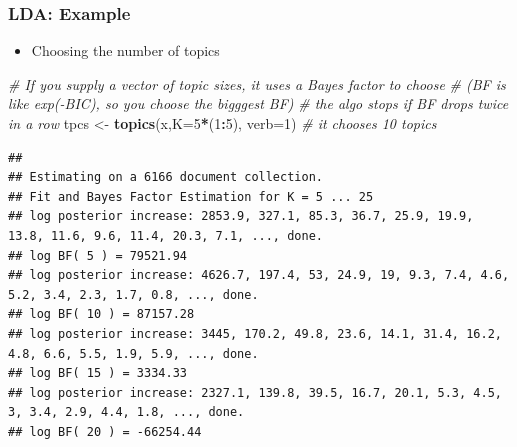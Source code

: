 \documentclass[
  shownotes,
  xcolor={svgnames},
  hyperref={colorlinks,citecolor=DarkBlue,linkcolor=DarkRed,urlcolor=DarkBlue}
  , aspectratio=169]{beamer}
\newenvironment{Shaded}{\begin{snugshade}}{\end{snugshade}}
\newcommand{\CommentTok}[1]{\textcolor[rgb]{0.56,0.35,0.01}{\textit{#1}}}
\newcommand{\DataTypeTok}[1]{\textcolor[rgb]{0.13,0.29,0.53}{#1}}
\newcommand{\DecValTok}[1]{\textcolor[rgb]{0.00,0.00,0.81}{#1}}
\newcommand{\KeywordTok}[1]{\textcolor[rgb]{0.13,0.29,0.53}{\textbf{#1}}}
\newcommand{\NormalTok}[1]{#1}
\newcommand{\OperatorTok}[1]{\textcolor[rgb]{0.81,0.36,0.00}{\textbf{#1}}}
\newcommand{\StringTok}[1]{\textcolor[rgb]{0.31,0.60,0.02}{#1}}
\begin{document}
\begin{frame}[fragile]
\frametitle{LDA: Example}

\begin{itemize}
\item Choosing the number of topics
\end{itemize}
\begin{scriptsize}


\begin{Shaded}
\begin{Highlighting}[]

\CommentTok{\# If you supply a vector of topic sizes, it uses a Bayes factor to choose}
\CommentTok{\# (BF is like exp({-}BIC), so you choose the bigggest BF)}
\CommentTok{\# the algo stops if BF drops twice in a row}
\NormalTok{tpcs \textless{}{-}}\StringTok{ }\KeywordTok{topics}\NormalTok{(x,}\DataTypeTok{K=}\DecValTok{5}\OperatorTok{*}\NormalTok{(}\DecValTok{1}\OperatorTok{:}\DecValTok{5}\NormalTok{), }\DataTypeTok{verb=}\DecValTok{1}\NormalTok{) }\CommentTok{\# it chooses 10 topics }
\end{Highlighting}
\end{Shaded}
\end{scriptsize}
\begin{tiny}


\begin{verbatim}
## 
## Estimating on a 6166 document collection.
## Fit and Bayes Factor Estimation for K = 5 ... 25
## log posterior increase: 2853.9, 327.1, 85.3, 36.7, 25.9, 19.9, 13.8, 11.6, 9.6, 11.4, 20.3, 7.1, ..., done.
## log BF( 5 ) = 79521.94
## log posterior increase: 4626.7, 197.4, 53, 24.9, 19, 9.3, 7.4, 4.6, 5.2, 3.4, 2.3, 1.7, 0.8, ..., done.
## log BF( 10 ) = 87157.28
## log posterior increase: 3445, 170.2, 49.8, 23.6, 14.1, 31.4, 16.2, 4.8, 6.6, 5.5, 1.9, 5.9, ..., done.
## log BF( 15 ) = 3334.33
## log posterior increase: 2327.1, 139.8, 39.5, 16.7, 20.1, 5.3, 4.5, 3, 3.4, 2.9, 4.4, 1.8, ..., done.
## log BF( 20 ) = -66254.44
\end{verbatim}

\end{tiny}
\end{frame}
\end{document}
